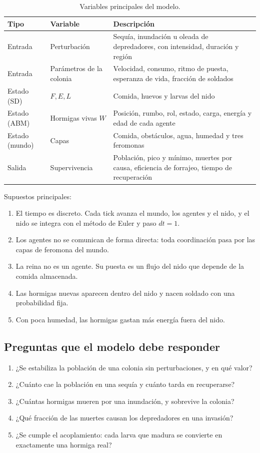 \documentclass[11pt,a4paper]{article}
\begin{document}
\begin{table}[H]
\centering
\caption{Variables principales del modelo.}
\label{tab:variables}
\begin{tabularx}{\textwidth}{@{}llX@{}}
\toprule
\textbf{Tipo} & \textbf{Variable} & \textbf{Descripción} \\
\midrule
Entrada & Perturbación & Sequía, inundación u oleada de depredadores, con intensidad, duración y región \\
Entrada & Parámetros de la colonia & Velocidad, consumo, ritmo de puesta, esperanza de vida, fracción de soldados \\
Estado (SD) & $F, E, L$ & Comida, huevos y larvas del nido \\
Estado (ABM) & Hormigas vivas $W$ & Posición, rumbo, rol, estado, carga, energía y edad de cada agente \\
Estado (mundo) & Capas & Comida, obstáculos, agua, humedad y tres feromonas \\
Salida & Supervivencia & Población, pico y mínimo, muertes por causa, eficiencia de forrajeo, tiempo de recuperación \\
\bottomrule
\end{tabularx}
\end{table}

Supuestos principales:
\begin{enumerate}
  \item El tiempo es discreto. Cada tick avanza el mundo, los agentes y el nido, y el nido se integra con el método de Euler y paso $dt = 1$.
  \item Los agentes no se comunican de forma directa: toda coordinación pasa por las capas de feromona del mundo.
  \item La reina no es un agente. Su puesta es un flujo del nido que depende de la comida almacenada.
  \item Las hormigas nuevas aparecen dentro del nido y nacen soldado con una probabilidad fija.
  \item Con poca humedad, las hormigas gastan más energía fuera del nido.
\end{enumerate}

\subsection{Preguntas que el modelo debe responder}

\begin{enumerate}
  \item ¿Se estabiliza la población de una colonia sin perturbaciones, y en qué valor?
  \item ¿Cuánto cae la población en una sequía y cuánto tarda en recuperarse?
  \item ¿Cuántas hormigas mueren por una inundación, y sobrevive la colonia?
  \item ¿Qué fracción de las muertes causan los depredadores en una invasión?
  \item ¿Se cumple el acoplamiento: cada larva que madura se convierte en exactamente una hormiga real?
\end{enumerate}
\end{document}
